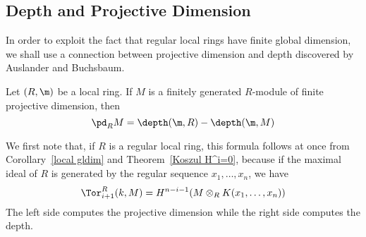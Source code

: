 \subsection{Depth and Projective Dimension}
In order to exploit the fact that regular local rings have finite global dimension, we shall use a connection between projective dimension and depth
discovered by Auslander and Buchsbaum.
\begin{theorem}
Let $(R,\m)$ be a local ring. If $M$ is a finitely generated $R$-module of finite projective dimension, then
\[\pd_RM=\depth(\m,R)-\depth(\m,M)\]
\end{theorem}
We first note that, if $R$ is a regular local ring, this formula follows at once from Corollary~\ref{local gldim} and Theorem~\ref{Koszul H^i=0}, because if the maximal ideal of $R$ is generated by the regular sequence $x_1,\dots,x_n$, we have
\[\Tor_{i+1}^R(k,M)=H^{n-i-1}(M\otimes_RK(x_1,\dots,x_n))\]
The left side computes the projective dimension while the right side computes the depth.
